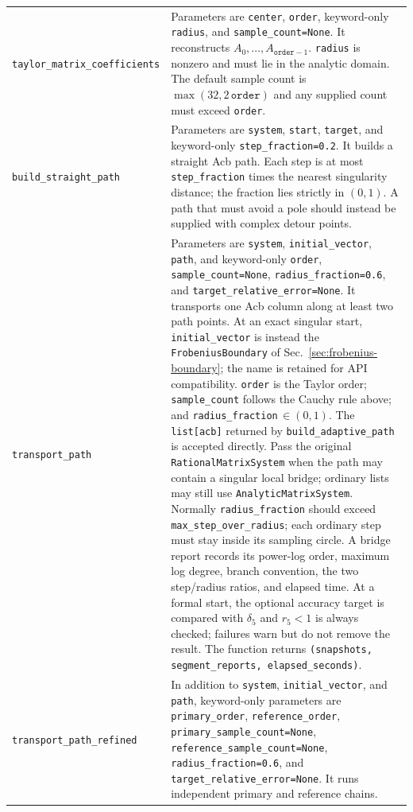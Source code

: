 \documentclass[11pt]{article}
\begin{document}
\begin{longtable}{L{0.36\textwidth}L{0.58\textwidth}}
\texttt{taylor\_matrix\_coefficients} & Parameters are \texttt{center}, \texttt{order},
keyword-only \texttt{radius}, and \texttt{sample\_count=None}.  It reconstructs
$A_0,\ldots,A_{\texttt{order}-1}$.  \texttt{radius} is nonzero and must lie in
the analytic domain.  The default sample count is $\max(32,2\,\texttt{order})$ and any
supplied count must exceed \texttt{order}. \\
\texttt{build\_straight\_path} & Parameters are \texttt{system}, \texttt{start},
\texttt{target}, and keyword-only \texttt{step\_fraction=0.2}.  It builds a straight Acb
path.  Each step is at most \texttt{step\_fraction} times the nearest
singularity distance; the fraction lies strictly in $(0,1)$.  A path that must avoid a pole
should instead be supplied with complex detour points. \\
\texttt{transport\_path} & Parameters are \texttt{system}, \texttt{initial\_vector},
\texttt{path}, and keyword-only \texttt{order}, \texttt{sample\_count=None},
\texttt{radius\_fraction=0.6}, and \texttt{target\_relative\_error=None}.  It transports one Acb column along at least two path points.
At an exact singular start, \texttt{initial\_vector} is instead the
\texttt{FrobeniusBoundary} of Sec.~\ref{sec:frobenius-boundary}; the name is retained for API
compatibility.
\texttt{order} is the Taylor
order; \texttt{sample\_count} follows the Cauchy rule above; and
\texttt{radius\_fraction}\,$\in(0,1)$.  The \texttt{list[acb]} returned by
\texttt{build\_adaptive\_path} is accepted directly.  Pass the original
\texttt{RationalMatrixSystem} when the path may contain a singular local bridge; ordinary
lists may still use \texttt{AnalyticMatrixSystem}.  Normally \texttt{radius\_fraction}
should exceed \texttt{max\_step\_over\_radius}; each ordinary step must stay inside its
sampling circle.  A bridge report records its power-log order, maximum log degree, branch
convention, the two step/radius ratios, and elapsed time.  At a formal start, the optional
accuracy target is compared with $\delta_5$ and $r_5<1$ is always checked; failures warn but
do not remove the result.  The function returns
\texttt{(snapshots, segment\_reports, elapsed\_seconds)}. \\
\texttt{transport\_path\_refined} & In addition to \texttt{system},
\texttt{initial\_vector}, and \texttt{path}, keyword-only parameters are
\texttt{primary\_order}, \texttt{reference\_order},
\texttt{primary\_sample\_count=None}, \texttt{reference\_sample\_count=None},
\texttt{radius\_fraction=0.6}, and \texttt{target\_relative\_error=None}.  It runs independent primary and reference chains.

\end{longtable}
\end{document}
